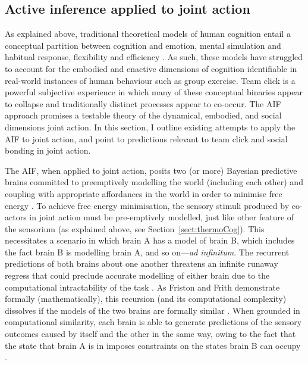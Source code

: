 \begin{CJK}{UTF8}{gbsn}
\section{Active inference applied to joint action \label{sect:activeInfJA}}
As explained above, traditional theoretical models of human cognition entail a conceptual partition between cognition and emotion, mental simulation and habitual response, flexibility and efficiency \citep{Clark2015}.  As such, these models have struggled to account for the embodied and enactive dimensions of cognition identifiable in real-world instances of human behaviour such as group exercise.  Team click is a powerful subjective experience in which many of these conceptual binaries appear to collapse and traditionally distinct processes appear to co-occur.  The AIF approach promises a testable theory of the dynamical, embodied, and social dimensions joint action.  In this section, I outline existing attempts to apply the AIF to joint action, and point to predictions relevant to team click and social bonding in joint action.

The AIF, when applied to joint action, posits two (or more) Bayesian predictive brains committed to preemptively modelling the world (including each other) and coupling with appropriate affordances in the world in order to minimise free energy \citep{Moutoussis2014,Friston2015,Friston2015a}.  To achieve free energy minimisation, the sensory stimuli produced by co-actors in joint action must be pre-emptively modelled, just like other feature of the sensorium (as explained above, see Section~\ref{sect:thermoCog}).  This necessitates a scenario in which brain A has a model of brain B, which includes the fact brain B is modelling brain A, and so on---\textit{ad infinitum}.  The recurrent predictions of both brains about one another threatens an infinite runaway regress that could preclude accurate modelling of either brain due to the computational intractability of the task \citep{Moutoussis2014,Friston2015}.  As Friston and Frith demonstrate formally (mathematically), this recursion (and its computational complexity) dissolves if the models of the two brains are formally similar \citep{Friston2015,Friston2015a}.
When grounded in computational similarity, each brain is able to generate predictions of the sensory outcomes caused by itself and the other in the same way, owing to the fact that the state that brain A is in imposes constraints on the states brain B can occupy \citep{Richardson2015}.


\end{CJK}

